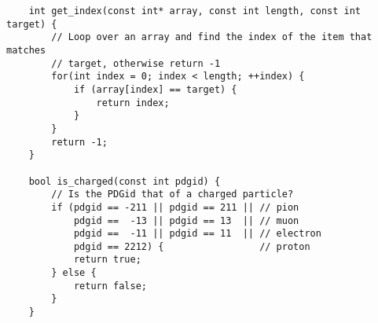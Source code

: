 \documentclass[]{article}
\begin{document}
\begin{verbatim}
    int get_index(const int* array, const int length, const int target) {
        // Loop over an array and find the index of the item that matches 
        // target, otherwise return -1
        for(int index = 0; index < length; ++index) {
            if (array[index] == target) {
                return index;
            }
        }
        return -1;
    }

    bool is_charged(const int pdgid) {
        // Is the PDGid that of a charged particle?
        if (pdgid == -211 || pdgid == 211 || // pion
            pdgid ==  -13 || pdgid == 13  || // muon
            pdgid ==  -11 || pdgid == 11  || // electron
            pdgid == 2212) {                 // proton
            return true;
        } else {
            return false;
        }
    }
\end{verbatim}


\end{document}
